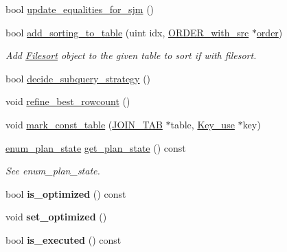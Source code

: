 \begin{DoxyCompactItemize}
\item 
bool \mbox{\hyperlink{group__Query__Optimizer_gaeaa6edcfa6c4d934dd42d505d9de2fef}{update\+\_\+equalities\+\_\+for\+\_\+sjm}} ()
\item 
bool \mbox{\hyperlink{group__Query__Optimizer_ga8c14b8b1b7b5f002b219140b565000db}{add\+\_\+sorting\+\_\+to\+\_\+table}} (uint idx, \mbox{\hyperlink{classJOIN_1_1ORDER__with__src}{O\+R\+D\+E\+R\+\_\+with\+\_\+src}} $\ast$\mbox{\hyperlink{classJOIN_ac06839682aae707b0e1d4fafd53abaf5}{order}})
\begin{DoxyCompactList}\small\item\em Add \mbox{\hyperlink{classFilesort}{Filesort}} object to the given table to sort if with filesort. \end{DoxyCompactList}\item 
bool \mbox{\hyperlink{group__Query__Optimizer_gab466b49a22220854ef8f11a2c4a2ae8a}{decide\+\_\+subquery\+\_\+strategy}} ()
\item 
void \mbox{\hyperlink{group__Query__Optimizer_gaef4f64b9b280796d9abe945b2eda94ac}{refine\+\_\+best\+\_\+rowcount}} ()
\item 
void \mbox{\hyperlink{group__Query__Optimizer_ga0db5dc577ffd7662b800cc6307183c2b}{mark\+\_\+const\+\_\+table}} (\mbox{\hyperlink{classJOIN__TAB}{J\+O\+I\+N\+\_\+\+T\+AB}} $\ast$table, \mbox{\hyperlink{classKey__use}{Key\+\_\+use}} $\ast$key)
\item 
\mbox{\label{classJOIN_aba37f9bde33de6c07c9b42fc88bfbe71}} 
\mbox{\hyperlink{classJOIN_a965b8cb3ded4b0e826a3cab5f7d88694}{enum\+\_\+plan\+\_\+state}} \mbox{\hyperlink{classJOIN_aba37f9bde33de6c07c9b42fc88bfbe71}{get\+\_\+plan\+\_\+state}} () const
\begin{DoxyCompactList}\small\item\em See enum\+\_\+plan\+\_\+state. \end{DoxyCompactList}\item 
\mbox{\label{classJOIN_ad0c77a0fc6c92c8213cf822c113f6723}} 
bool {\bfseries is\+\_\+optimized} () const
\item 
\mbox{\label{classJOIN_aa8f4286f294bd6c2af1498f00404fb6b}} 
void {\bfseries set\+\_\+optimized} ()
\item 
\mbox{\label{classJOIN_a36c6b0cda782b4e777712ef71b1eb17f}} 
bool {\bfseries is\+\_\+executed} () const
\item 

\end{DoxyCompactItemize}
